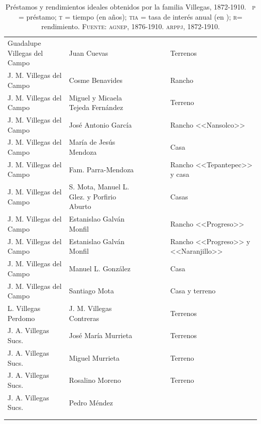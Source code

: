 \documentclass[14pt,twoside,final]{extbook} %
\begin{document}
{\begin{longtable}[c]{@{}p{2.5cm}lrSrrl@{}}
Guadalupe Villegas del Campo & Juan Cuevas &  &  & {} & {} & Terrenos \\
J. M. Villegas del Campo & Cosme Benavides &  &  &  &  & Rancho \\
J. M. Villegas del Campo & Miguel y Micaela Tejeda Fernández &  & {} & {} & {} & Terreno \\
J. M. Villegas del Campo & José Antonio García &  &  &  &  & Rancho <<Nansolco>> \\
J. M. Villegas del Campo & María de Jesús Mendoza &  &  &  &  & Casa \\
J. M. Villegas del Campo & Fam. Parra-Mendoza &  &  &  &  & Rancho <<Tepantepec>> y casa \\
J. M. Villegas del Campo & S. Mota, Manuel L. Glez. y Porfirio Aburto &  &  &  &  & Casas \\
J. M. Villegas del Campo & Estanislao Galván Monfil &  &  & {} & {} & Rancho <<Progreso>> \\
J. M. Villegas del Campo & Estanislao Galván Monfil &  & {} & {} & {} & Rancho <<Progreso>> y <<Naranjillo>> \\
J. M. Villegas del Campo & Manuel L. González &  &  &  &  & Casa \\
J. M. Villegas del Campo & Santiago Mota &  &  &  &  & Casa y terreno \\
L. Villegas Perdomo & J. M. Villegas Contreras &  & {} & {} & {} & Terrenos \\
J. A. Villegas Sucs. & José María Murrieta &  &  &  &  & Terrenos \\
J. A. Villegas Sucs. & Miguel Murrieta &  & {} & {} & {} & Terreno \\
J. A. Villegas Sucs. & Rosalino Moreno &  & {} & {} & {} & Terreno \\
J. A. Villegas Sucs. & Pedro Méndez &  & {} & {} & {} & {} \\
{} & {} &  & {} & {} &  & {} \\
\caption[Préstamos y rendimientos ideales obtenidos por la familia Villegas, 1872-1910]{Préstamos y rendimientos ideales obtenidos por la familia Villegas, 1872-1910. ~\textsc{p} = préstamo;  \textsc{t} = tiempo (en años);  \textsc{tia} = tasa de interés anual (en );  \textsc{r}= rendimiento. \textsc{Fuente:} \textsc{agnep}, 1876-1910. \textsc{arppj}, 1872-1910.}
\label{tab:prestamos-y-rendimientos}
\end{longtable}
}%
\end{document}
